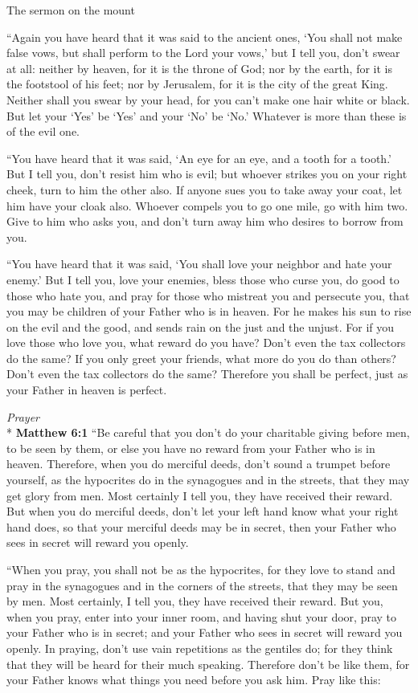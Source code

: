 \documentclass[10pt,twoside]{article} %
\newcommand{\quotesize}{\normalsize{}}
\newenvironment{quotetext}{\begingroup\quotesize}{\endgroup}
\newcommand{\intex}[1]{\index[texts]{#1}}
\newcommand{\bible}[2]{\begin{quotetext}\textbf{#1}\intex{#1} #2\end{quotetext}}
\newcommand{\matthew}[2]{\bible{Matthew #1}{#2}}
\newcommand{\subhead}[1]{\emph{#1}\\*}
\begin{document}
\begin{section}{The sermon on the mount}
{   ``Again you have heard that it was said to the ancient ones, `You shall not make false vows, but shall perform to the Lord your vows,'    but I tell you, don't swear at all: neither by heaven, for it is the throne of God;    nor by the earth, for it is the footstool of his feet; nor by Jerusalem, for it is the city of the great King.    Neither shall you swear by your head, for you can't make one hair white or black.    But let your `Yes' be `Yes' and your `No' be `No.' Whatever is more than these is of the evil one.

   ``You have heard that it was said, `An eye for an eye, and a tooth for a tooth.'    But I tell you, don't resist him who is evil; but whoever strikes you on your right cheek, turn to him the other also.    If anyone sues you to take away your coat, let him have your cloak also.    Whoever compels you to go one mile, go with him two.    Give to him who asks you, and don't turn away him who desires to borrow from you.

   ``You have heard that it was said, `You shall love your neighbor  and hate your enemy.'    But I tell you, love your enemies, bless those who curse you, do good to those who hate you, and pray for those who mistreat you and persecute you,    that you may be children of your Father who is in heaven. For he makes his sun to rise on the evil and the good, and sends rain on the just and the unjust.    For if you love those who love you, what reward do you have? Don't even the tax collectors do the same?    If you only greet your friends, what more do you do than others? Don't even the tax collectors do the same?    Therefore you shall be perfect, just as your Father in heaven is perfect.
}

\subhead{Prayer}
\matthew{6:1}{
    ``Be careful that you don't do your charitable giving before men, to be seen by them, or else you have no reward from your Father who is in heaven.    Therefore, when you do merciful deeds, don't sound a trumpet before yourself, as the hypocrites do in the synagogues and in the streets, that they may get glory from men. Most certainly I tell you, they have received their reward.    But when you do merciful deeds, don't let your left hand know what your right hand does,    so that your merciful deeds may be in secret, then your Father who sees in secret will reward you openly.

   ``When you pray, you shall not be as the hypocrites, for they love to stand and pray in the synagogues and in the corners of the streets, that they may be seen by men. Most certainly, I tell you, they have received their reward.    But you, when you pray, enter into your inner room, and having shut your door, pray to your Father who is in secret; and your Father who sees in secret will reward you openly.    In praying, don't use vain repetitions as the gentiles do; for they think that they will be heard for their much speaking.    Therefore don't be like them, for your Father knows what things you need before you ask him.    Pray like this:
}


\end{section}
\end{document}
